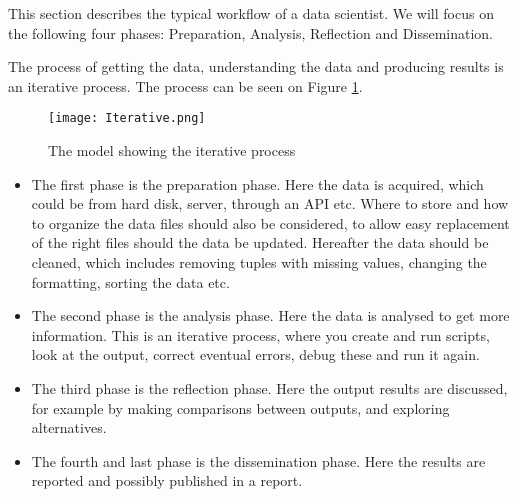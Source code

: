\documentclass[Report.tex]{subfiles}
\begin{document}
This section describes the typical workflow of a data scientist. We will focus on the following four phases: Preparation, Analysis, Reflection and Dissemination.

The process of getting the data, understanding the data and producing results is an iterative process. The process can be seen on Figure \ref{Fig:Iterative}.

\begin{figure}
\center
\texttt{[image: Iterative.png]}
\caption{The model showing the iterative process\cite[Chapter 2]{Guo}}
\label{Fig:Iterative}
\end{figure}
\begin{itemize}


\item The first phase is the preparation phase. Here the data is acquired, which could be from hard disk, server, through an API etc. Where to store and how to organize the data files should also be considered, to allow easy replacement of the right files should the data be updated. Hereafter the data should be cleaned, which includes removing tuples with missing values, changing the formatting, sorting the data etc.


\item The second phase is the analysis phase. Here the data is analysed to get more information. This is an iterative process, where you create and run scripts,  look at the output, correct eventual errors, debug these and run it again. 

\item The third phase is the reflection phase. Here the output results are discussed, for example by making comparisons between outputs, and exploring alternatives.

\item The fourth and last phase is the dissemination phase. Here the results are reported and possibly published in a report.
\cite[Chapter 2]{Guo}


\end{itemize}
\end{document}
